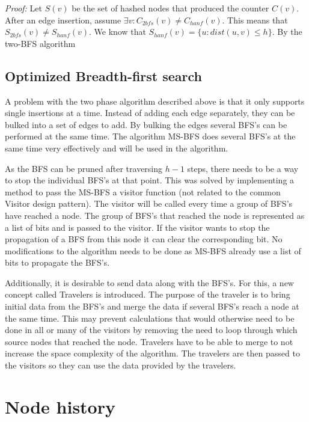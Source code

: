 \textit{Proof: } Let $S(v)$ be the set of hashed nodes that produced the counter $C(v)$. After an edge insertion, assume $\exists v : C_{2bfs}(v) \ne C_{hanf}(v)$. This means that $S_{2bfs}(v) \ne S_{hanf}(v)$. We know that $S_{hanf}(v) = \{ u : dist(u,v) \leq h \}$. By the two-BFS algorithm 

\subsection{Optimized Breadth-first search}

A problem with the two phase algorithm described above is that it only supports single insertions at a time. Instead of adding each edge separately, they can be bulked into a set of edges to add. By bulking the edges several BFS's can be performed at the same time. The algorithm MS-BFS \cite{msbfs} does several BFS's at the same time very effectively and will be used in the algorithm. 

As the BFS can be pruned after traversing $h-1$ steps, there needs to be a way to stop the individual BFS's at that point. This was solved by implementing a method to pass the MS-BFS a visitor function (not related to the common Visitor design pattern). The visitor will be called every time a group of BFS's have reached a node. The group of BFS's that reached the node is represented as a list of bits and is passed to the visitor. If the visitor wants to stop the propagation of a BFS from this node it can clear the corresponding bit. No modifications to the algorithm needs to be done as MS-BFS already use a list of bits to propagate the BFS's.

Additionally, it is desirable to send data along with the BFS's. For this, a new concept called Travelers is introduced. The purpose of the traveler is to bring initial data from the BFS's and merge the data if several BFS's reach a node at the same time. This may prevent calculations that would otherwise need to be done in all or many of the visitors by removing the need to loop through which source nodes that reached the node. Travelers have to be able to merge to not increase the space complexity of the algorithm. The travelers are then passed to the visitors so they can use the data provided by the travelers. 

\section{Node history}

